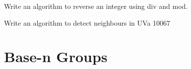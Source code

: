 \begin{example}
Write an algorithm to reverse an integer using div and mod.
\end{example}

\begin{example}
Write an algorithm to detect neighbours in UVa 10067
\end{example}


\section{Base-n Groups}

